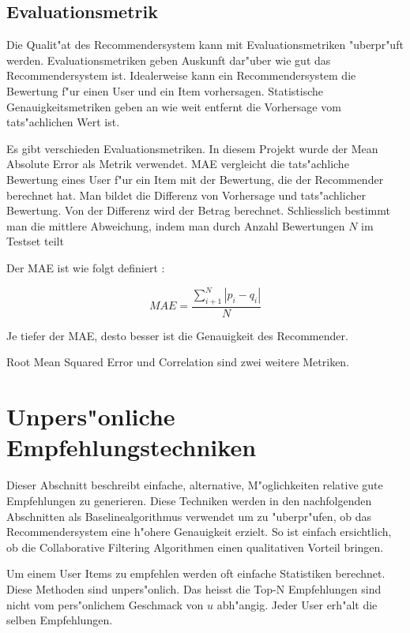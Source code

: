 \documentclass[a4paper, 12pt]{article}
\begin{document}
\subsection{Evaluationsmetrik}
\label{sec:evaluationmetrik}

Die Qualit"at des Recommendersystem kann mit Evaluationsmetriken "uberpr"uft werden. Evaluationsmetriken geben Auskunft dar"uber wie gut das Recommendersystem ist. Idealerweise kann ein Recommendersystem die Bewertung f"ur einen User und ein Item vorhersagen. Statistische Genauigkeitsmetriken geben an wie weit entfernt die Vorhersage vom tats"achlichen Wert ist. 

Es gibt verschieden Evaluationsmetriken. In diesem Projekt wurde der Mean Absolute Error als Metrik verwendet. MAE vergleicht die tats"achliche Bewertung eines User f"ur ein Item mit der Bewertung, die der Recommender berechnet hat. Man bildet die Differenz von Vorhersage und tats"achlicher Bewertung. Von der Differenz wird der Betrag berechnet. Schliesslich bestimmt man die mittlere Abweichung, indem man durch Anzahl Bewertungen $N$ im Testset teilt 

Der MAE ist wie folgt definiert \cite{sarwar01}:

\begin{equation}
  \label{eq:mae}
  MAE = \frac{\sum_{i+1}^N | p_i-q_i | }{N}
\end{equation}

Je tiefer der MAE, desto besser ist die Genauigkeit des Recommender.

Root Mean Squared Error und Correlation sind zwei weitere Metriken.

\section{Unpers"onliche Empfehlungstechniken}
\label{sec:simple}

Dieser Abschnitt beschreibt einfache, alternative, M"oglichkeiten relative gute Empfehlungen zu generieren. Diese Techniken werden in den nachfolgenden Abschnitten als Baselinealgorithmus verwendet um zu "uberpr"ufen, ob das Recommendersystem eine h"ohere Genauigkeit erzielt. So ist einfach ersichtlich, ob die Collaborative Filtering Algorithmen einen qualitativen Vorteil bringen.

Um einem User Items zu empfehlen werden oft einfache Statistiken berechnet. Diese Methoden sind unpers"onlich. Das heisst die Top-N Empfehlungen sind nicht vom pers"onlichem Geschmack von $u$ abh"angig. Jeder User erh"alt die selben Empfehlungen. 
\end{document}
